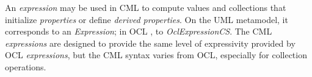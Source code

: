\begin{definition}
An \emph{expression} may be used in CML to compute values and collections that initialize \emph{properties} or define \emph{derived properties}.
On the UML \cite{uml} metamodel,
it corresponds to an \emph{Expression};
in OCL \cite{ocl}, to \emph{OclExpressionCS}.
The CML \emph{expressions} are designed to provide the same level of
expressivity provided by OCL \emph{expressions},
but the CML syntax varies from OCL, especially for collection operations.
\end{definition}
